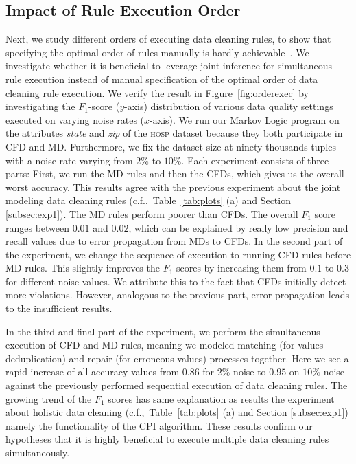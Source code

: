 \subsection{Impact of Rule Execution Order}
\label{subsec:exp3}
Next, we study different orders of executing data cleaning rules, to show that specifying the optimal order of rules manually is hardly achievable~\cite{Dallachiesa:2013:NCD:2463676.2465327}. We investigate whether it is beneficial to leverage joint inference for simultaneous rule execution instead of manual specification of the optimal order of data cleaning rule execution. We verify the result in Figure~\ref{fig:orderexec} by investigating the $F_1$-score ($y$-axis) distribution of various data quality settings executed on varying noise rates ($x$-axis). We run our Markov Logic program on the attributes \textsl{state} and \textsl{zip} of the \textsc{hosp} dataset because they both participate in CFD and MD. Furthermore, we fix the dataset size at ninety thousands tuples with a noise rate varying from $2\%$ to $10\%$. Each experiment consists of three parts: First, we run the MD rules and then the CFDs, which gives us the overall worst accuracy. This results agree with the previous experiment about the joint modeling data cleaning rules (c.f.,~Table~\ref{tab:plots} (a) and Section \ref{subsec:exp1}). The MD rules perform poorer than CFDs. The overall $F_1$ score ranges between $0.01$ and $0.02$, which can be explained by really low precision and recall values due to error propagation from MDs to CFDs.  
In the second part of the experiment, we change the sequence of execution to running CFD rules before MD rules. This slightly improves the $F_1$ scores by increasing them from $0.1$ to $0.3$ for different noise values. We attribute this to the fact that CFDs initially detect more violations. However, analogous to the previous part, error propagation leads to the insufficient results. 

In the third and final part of the experiment, we perform the simultaneous execution of CFD and MD rules, meaning we modeled matching (for values deduplication) and repair (for erroneous values) processes together. Here we see a rapid increase of all accuracy values from $0.86$ for $2\%$ noise to $0.95$ on $10\%$ noise against the previously performed sequential execution of data cleaning rules. The growing trend of the $F_1$ scores has same explanation as results the experiment about holistic data cleaning (c.f.,~Table~\ref{tab:plots} (a) and Section \ref{subsec:exp1}) namely the functionality of the CPI algorithm. These results confirm our hypotheses that it is highly beneficial to execute multiple data cleaning rules simultaneously.  

